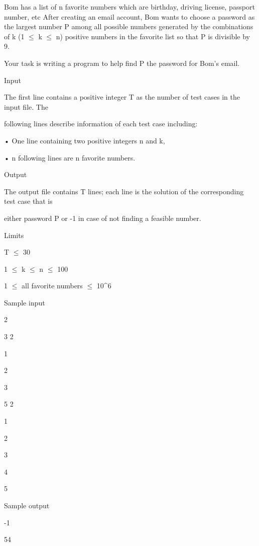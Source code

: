 



   Bom has a list of n favorite numbers which are birthday, driving license, passport number, etc After creating an email account, Bom wants to choose a password as the largest number P among all possible numbers generated by the combinations of k (1  $\le$  k  $\le$  n) positive numbers in the favorite list so that P is divisible by 9.  




   Your task is writing a program to help find P the password for Bom’s email.  




   Input   


   The first line contains a positive integer T as the number of test cases in the input file. The   


   following lines describe information of each test case including:   


   • One line containing two positive integers n and k,   


   • n following lines are n favorite numbers.  




   Output   


   The output file contains T lines; each line is the solution of the corresponding test case that is   


   either password P or -1 in case of not finding a feasible number.  




   Limits   


   T  $\le$  30   


   1  $\le$  k  $\le$  n  $\le$  100   


   1  $\le$  all favorite numbers  $\le$  10^6  




   Sample input   


   2   


   3 2   


   1   


   2   


   3   


   5 2   


   1   


   2   


   3   


   4   


   5  




   Sample output   


   -1   


   54  
